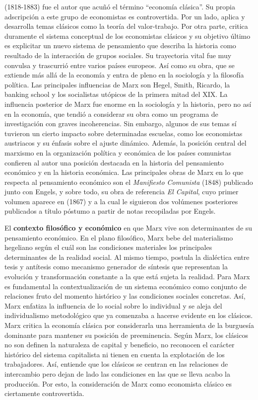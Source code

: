 \documentclass{nuevotema}
\begin{document}
 (1818-1883) fue el autor que acuñó el término ``economía clásica''. Su propia adscripción a este grupo de economistas es controvertida. Por un lado, aplica y desarrolla temas clásicos como la teoría del valor-trabajo. Por otra parte, critica duramente el sistema conceptual de los economistas clásicos y su objetivo último es explicitar un nuevo sistema de pensamiento que describa la historia como resultado de la interacción de grupos sociales. Su trayectoria vital fue muy convulsa y trascurrió entre varios países europeos. Así como su obra, que se extiende más allá de la economía y entra de pleno en la sociología y la filosofía política. Las principales influencias de Marx son Hegel, Smith, Ricardo, la banking school y los socialistas utópicos de la primera mitad del XIX. La influencia posterior de Marx fue enorme en la sociología y la historia, pero no así en la economía, que tendió a considerar su obra como un programa de investigación con graves incoherencias. Sin embargo, algunos de sus temas sí tuvieron un cierto impacto sobre determinadas escuelas, como los economistas austriacos y su énfasis sobre el ajuste dinámico. Además, la posición central del marxismo en la organización política y económica de los países comunistas confieren al autor una posición destacada en la historia del pensamiento económico y en la historia económica. Las principales obras de Marx en lo que respecta al pensamiento económico son el \textit{Manifiesto Comunista} (1848) publicado junto con Engels, y sobre todo, su obra de referencia \textit{El Capital}, cuyo primer volumen aparece en (1867) y a la cual le siguieron dos volúmenes posteriores publicados a título póstumo a partir de notas recopiladas por Engels.

El \textbf{contexto filosófico y económico} en que Marx vive son determinantes de su pensamiento económico. En el plano filosófico, Marx bebe del materialismo hegeliano según el cuál son las condiciones materiales los principales determinantes de la realidad social. Al mismo tiempo, postula la dialéctica entre tesis y antítesis como mecanismo generador de síntesis que representan la evolución y transformación constante a la que está sujeta la realidad. Para Marx es fundamental la contextualización de un sistema económico como conjunto de relaciones fruto del momento histórico y las condiciones sociales concretas. Así, Marx enfatiza la influencia de lo social sobre lo individual y se aleja del individualismo metodológico que ya comenzaba a hacerse evidente en los clásicos. Marx critica la economía clásica por considerarla una herramienta de la burguesía dominante para mantener su posición de preeminencia. Según Marx, los clásicos no son definen la naturaleza de capital y beneficio, no reconocen el carácter histórico del sistema capitalista ni tienen en cuenta la explotación de los trabajadores. Así, entiende que los clásicos se centran en las relaciones de intercambio pero dejan de lado las condiciones en las que se lleva acabo la producción. Por esto, la consideración de Marx como economista clásico es ciertamente controvertida. 
\end{document}
